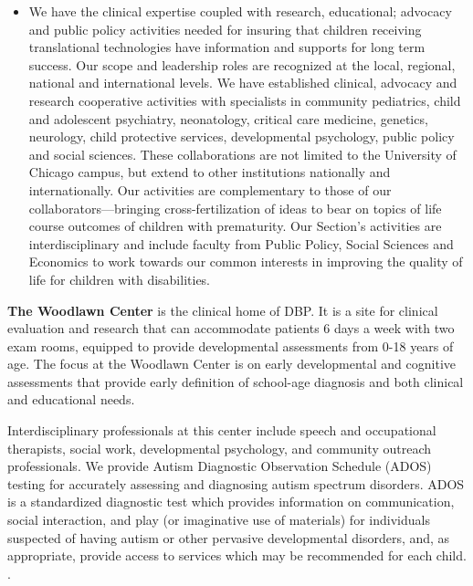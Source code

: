 \begin{itemize}
\item We have the clinical expertise coupled with research, educational; advocacy and public policy activities needed for insuring that children receiving translational technologies have information and supports for long term success. Our scope and leadership roles are recognized at the local, regional, national and international levels. We have established clinical, advocacy and research cooperative activities with specialists in community pediatrics, child and adolescent psychiatry, neonatology, critical care medicine, genetics, neurology, child protective services, developmental psychology, public policy and social sciences. These collaborations are not limited to the University of Chicago campus, but extend to other institutions nationally and internationally. Our activities are complementary to those of our collaborators—bringing cross-fertilization of ideas to bear on topics of life course outcomes of children with prematurity. Our Section’s activities are interdisciplinary and include faculty from Public Policy, Social Sciences and Economics to work towards our common interests in improving the quality of life for children with disabilities. 
\end{itemize}

\textbf{The Woodlawn Center} is the clinical home of DBP. It is a site for clinical evaluation and research that can accommodate patients 6 days a week with two exam rooms, equipped to provide developmental assessments from 0-18 years of age. The focus at the Woodlawn Center is on early developmental and cognitive assessments that provide early definition of school-age diagnosis and both clinical and educational needs. 

Interdisciplinary professionals at this center include speech and occupational therapists, social work, developmental psychology, and community outreach professionals.   We provide Autism Diagnostic Observation Schedule (ADOS) testing for accurately assessing and diagnosing autism spectrum disorders.  ADOS is a standardized diagnostic test which provides information on communication, social interaction, and play (or imaginative use of materials) for individuals suspected of having autism or other pervasive developmental disorders, and, as appropriate, provide access to services which may be recommended for each child. .  

